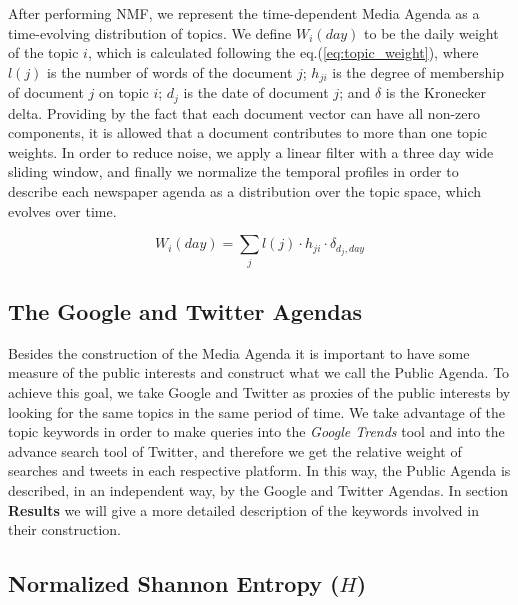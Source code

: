 \documentclass{bmcart}
\begin{document}
\par After performing NMF, we represent the time-dependent Media Agenda as a time-evolving distribution of topics. We define $W_i(day)$ to be the daily weight of the topic $i$, which is calculated following the eq.(\ref{eq:topic_weight}), where $l(j)$ is the number of words of the document $j$; $h_{ji}$ is the degree of membership of document $j$ on topic $i$; $d_j$ is the date of document $j$; and $\delta$ is the Kronecker delta. 
Providing by the fact that each document vector can have all non-zero components, it is allowed that a document contributes to more than one topic weights.
In order to reduce noise, we apply a linear filter with a three day wide sliding window, and finally we normalize the temporal profiles in order to describe each newspaper agenda as a distribution over the topic space, which evolves over time. 

\begin{equation}
W_i(day) = \sum_j l(j) \cdot h_{ji} \cdot \delta_{d_j,day}
\label{eq:topic_weight}
\end{equation}

\subsection*{The Google and Twitter Agendas}
 
\par Besides the construction of the Media Agenda it is important to have some measure of the public interests and construct what we call the Public Agenda. 
To achieve this goal, we take Google and Twitter as proxies of the public interests by looking for the same topics in the same period of time. We take advantage of the topic keywords in order to make queries into the \emph{Google Trends} tool and into the advance search tool of Twitter, and therefore we get the relative weight of searches and tweets in each respective platform. 
In this way, the Public Agenda is described, in an independent way, by the Google and Twitter Agendas. 
In section \textbf{Results} we will give a more detailed description of the keywords involved in their construction.

\subsection*{Normalized Shannon Entropy ($H$)}
\end{document}
